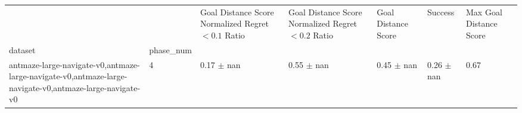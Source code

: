 \begin{tabular}{lllllll}
\toprule
 &  & Goal Distance Score Normalized Regret $< 0.1$ Ratio & Goal Distance Score Normalized Regret $< 0.2$ Ratio & Goal Distance Score & Success & Max Goal Distance Score \\
dataset & phase_num &  &  &  &  &  \\
\midrule
antmaze-large-navigate-v0,antmaze-large-navigate-v0,antmaze-large-navigate-v0,antmaze-large-navigate-v0 & 4 & 0.17 $\pm$ nan & 0.55 $\pm$ nan & 0.45 $\pm$ nan & 0.26 $\pm$ nan & 0.67 \\
\cline{1-7}
\bottomrule
\end{tabular}
